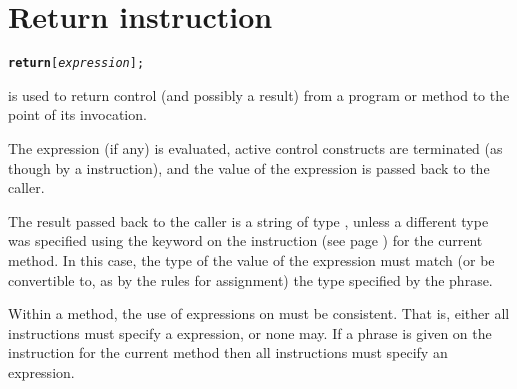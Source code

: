 \chapter{Return instruction}\label{refreturn}
\begin{shaded}
\begin{alltt}
\textbf{return} [\emph{expression}];
\end{alltt}
\end{shaded}
  is used to return control (and possibly a result)
from a \nr{} program or method to the point of its invocation.
 
The expression (if any) is evaluated, active control constructs are
terminated (as though by a  instruction), and the value of
the expression is passed back to the caller.
 
The result passed back to the caller is a string of type ,
unless a different type was specified using the  keyword
on the   instruction (see page \pageref{refmethod})  for the current
method.
In this case, the type of the value of the expression must match (or be
convertible to, as by the rules for assignment) the type specified by
the  phrase.
 
Within a method, the use of expressions on  must be
consistent.  That is, either all  instructions must
specify a expression, or none may.
If a  phrase is given on the  instruction
for the current method then all  instructions must
specify an expression.
